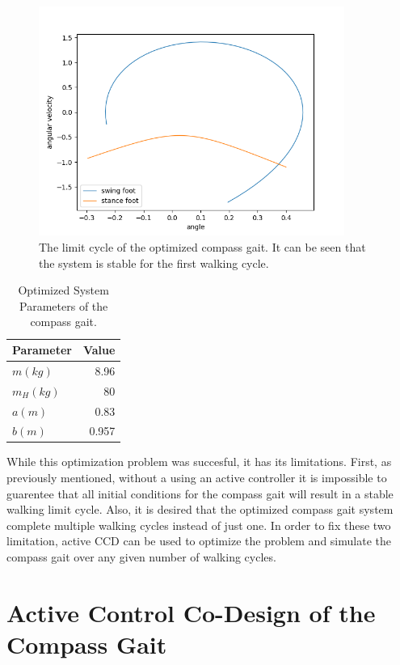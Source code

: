 \documentclass{./springer/svjour3}
\begin{document}
\begin{figure}[h]
\centering
\includegraphics[width=10cm]{./figures/passiveopt_limitcycle.png}
\caption{The limit cycle of the optimized compass gait. It can be seen that the system is stable for the first walking cycle.}
\label{fig:passiveopt}
\end{figure}

\begin{table}[h]
\centering
\caption{Optimized System Parameters of the compass gait.}
\begin{tabular}{lr}
\toprule
Parameter & Value \\
\midrule
$m (kg)$ & 8.96 \\
$m_H (kg)$ & 80 \\
$a (m)$ & 0.83 \\
$b (m)$ & 0.957 \\
\bottomrule
\end{tabular}
\label{tab:optparam}
\end{table}

While this optimization problem was succesful, it has its limitations. First, as previously mentioned, without a using an active controller
it is impossible to guarentee that all initial conditions for the compass gait will result in a stable walking limit cycle. Also, it is desired that the optimized
compass gait system complete multiple walking cycles instead of just one. In order to fix these two limitation, active CCD can be used to optimize the problem 
and simulate the compass gait over any given number of walking cycles.

\clearpage

\section{Active Control Co-Design of the Compass Gait}
\end{document}
